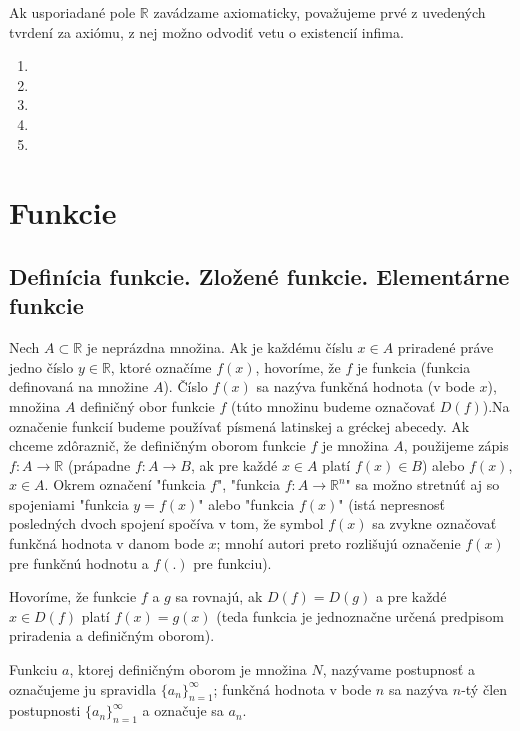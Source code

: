 Ak usporiadané pole $\mathbb{R}$ zavádzame axiomaticky, považujeme prvé z
uvedených tvrdení za axiómu, z nej možno odvodiť vetu o existencií infima.

\showanswers
\begin{enumerate}[resume]
  \item {}
  \hideanswers
  \item {}
  \item {}
  \item {}
  \item {}
\end{enumerate}

\section{Funkcie}
\subsection{Definícia funkcie. Zložené funkcie. Elementárne funkcie}

Nech $A\subset \mathbb{R}$ je neprázdna množina. Ak je každému číslu $x\in A$
priradené práve jedno číslo $y\in\mathbb{R}$, ktoré označíme $f(x)$, hovoríme,
že $f$ je funkcia (funkcia definovaná na množine $A$). Číslo $f(x)$ sa nazýva
funkčná hodnota (v bode $x$), množina $A$ definičný obor funkcie $f$ (túto
množinu budeme označovať $D(f)$).Na označenie funkcií budeme používať písmená
latinskej a gréckej abecedy. Ak chceme zdôraznič, že definičným oborom funkcie
$f$ je množina $A$, použijeme zápis $f:A \rightarrow \mathbb{R}$ (prápadne $f:A
\rightarrow B$, ak pre každé $x\in A$ platí $f(x)\in B$) alebo $f(x)$, $x\in
A$. Okrem označení "funkcia $f$", "funkcia $f:A \rightarrow \mathbb{R}^n$" sa
možno stretnúť aj so spojeniami "funkcia $y=f(x)$" alebo "funkcia $f(x)$" (istá
nepresnosť posledných dvoch spojení spočíva v tom, že symbol $f(x)$ sa zvykne
označovať funkčná hodnota v danom bode $x$; mnohí autori preto rozlišujú
označenie $f(x)$ pre funkčnú hodnotu a $f(.)$ pre funkciu).

Hovoríme, že funkcie $f$ a $g$ sa rovnajú, ak $D(f)=D(g)$ a pre každé $x\in
D(f)$ platí $f(x)=g(x)$ (teda funkcia je jednoznačne určená predpisom
priradenia a definičným oborom).

Funkciu $a$, ktorej definičným oborom je množina $N$, nazývame postupnosť a
označujeme ju spravidla $\{a_n\}_{n=1}^\infty$; funkčná hodnota v bode $n$ sa
nazýva $n$-tý člen postupnosti $\{a_n\}_{n=1}^\infty$ a označuje sa $a_n$.


